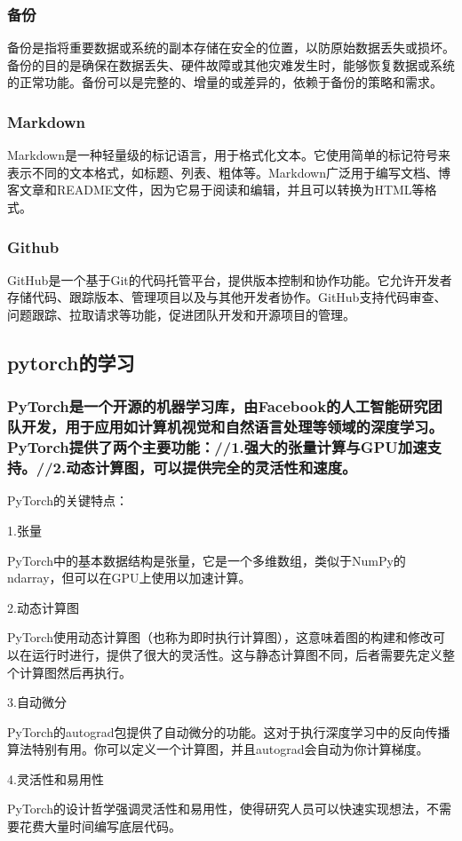 \documentclass[UTF8,a4paper]{ctexart}
\begin{document}
\begin{sloppypar}
	\subsubsection{备份}
	备份是指将重要数据或系统的副本存储在安全的位置，以防原始数据丢失或损坏。备份的目的是确保在数据丢失、硬件故障或其他灾难发生时，能够恢复数据或系统的正常功能。备份可以是完整的、增量的或差异的，依赖于备份的策略和需求。
	\subsubsection{Markdown}
	Markdown是一种轻量级的标记语言，用于格式化文本。它使用简单的标记符号来表示不同的文本格式，如标题、列表、粗体等。Markdown广泛用于编写文档、博客文章和README文件，因为它易于阅读和编辑，并且可以转换为HTML等格式。
	\subsubsection{Github}
	GitHub是一个基于Git的代码托管平台，提供版本控制和协作功能。它允许开发者存储代码、跟踪版本、管理项目以及与其他开发者协作。GitHub支持代码审查、问题跟踪、拉取请求等功能，促进团队开发和开源项目的管理。
	\subsection{pytorch的学习}
	\subsubsection{PyTorch是一个开源的机器学习库，由Facebook的人工智能研究团队开发，用于应用如计算机视觉和自然语言处理等领域的深度学习。PyTorch提供了两个主要功能：//1.强大的张量计算与GPU加速支持。//2.动态计算图，可以提供完全的灵活性和速度。}
	PyTorch的关键特点：
	
	1.张量
	
	PyTorch中的基本数据结构是张量，它是一个多维数组，类似于NumPy的ndarray，但可以在GPU上使用以加速计算。
	
	2.动态计算图
	
	PyTorch使用动态计算图（也称为即时执行计算图），这意味着图的构建和修改可以在运行时进行，提供了很大的灵活性。这与静态计算图不同，后者需要先定义整个计算图然后再执行。
	
	3.自动微分
	
	PyTorch的autograd包提供了自动微分的功能。这对于执行深度学习中的反向传播算法特别有用。你可以定义一个计算图，并且autograd会自动为你计算梯度。
	
	4.灵活性和易用性
	
	PyTorch的设计哲学强调灵活性和易用性，使得研究人员可以快速实现想法，不需要花费大量时间编写底层代码。
	

\end{sloppypar}
\end{document}
